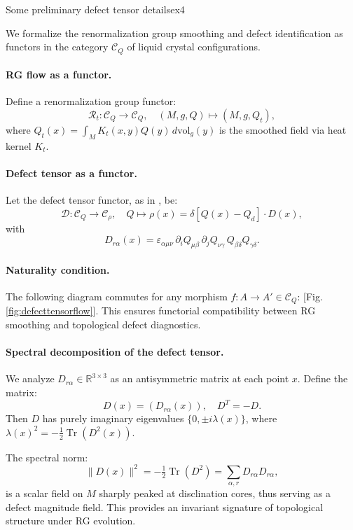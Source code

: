 	\begin{example}{Some preliminary defect tensor details}{ex4}
		
		We formalize the renormalization group smoothing and defect identification as functors in the category \( \mathcal{C}_Q \) of liquid crystal configurations.
		
		\paragraph{RG flow as a functor.}
		Define a renormalization group functor:
		\[
		\mathcal{R}_t: \mathcal{C}_Q \to \mathcal{C}_Q, \quad (M, g, Q) \mapsto (M, g, Q_t),
		\]
		where \( Q_t(x) = \int_M K_t(x,y) Q(y) \, d\mathrm{vol}_g(y) \) is the smoothed field via heat kernel \( K_t \).
		
		\paragraph{Defect tensor as a functor.}
		Let the defect tensor functor, as in \cite{schimming2025defect}, be:
		\[
		\mathscr{D}: \mathcal{C}_Q \to \mathcal{C}_\rho, \quad Q \mapsto \rho(x) = \delta[Q(x) - Q_d] \cdot D(x),
		\]
		with
		\[
		D_{r\alpha}(x) = \varepsilon_{\alpha\mu\nu} \, \partial_i Q_{\mu\beta} \, \partial_j Q_{\nu\gamma} \, Q_{\beta\delta} Q_{\gamma\delta}.
		\]
		
		\paragraph{Naturality condition.}
		The following diagram commutes for any morphism \( f: A \to A' \in \mathcal{C}_Q \): [Fig. \ref{fig:defecttensorflow}]. This ensures functorial compatibility between RG smoothing and topological defect diagnostics.
		
		\paragraph{Spectral decomposition of the defect tensor.}
		We analyze \( D_{r\alpha} \in \mathbb{R}^{3 \times 3} \) as an antisymmetric matrix at each point \( x \). Define the matrix:
		\[
		D(x) = \left( D_{r\alpha}(x) \right), \quad D^T = -D.
		\]
		Then \( D \) has purely imaginary eigenvalues \( \{0, \pm i\lambda(x)\} \), where \( \lambda(x)^2 = -\tfrac{1}{2} \operatorname{Tr}(D^2(x)) \).
		
		The spectral norm:
		\[
		\|D(x)\|^2 = -\tfrac{1}{2} \operatorname{Tr}(D^2) = \sum_{\alpha, r} D_{r\alpha} D_{r\alpha},
		\]
		is a scalar field on \( M \) sharply peaked at disclination cores, thus serving as a defect magnitude field. This provides an invariant signature of topological structure under RG evolution.
		
	\end{example}
	
